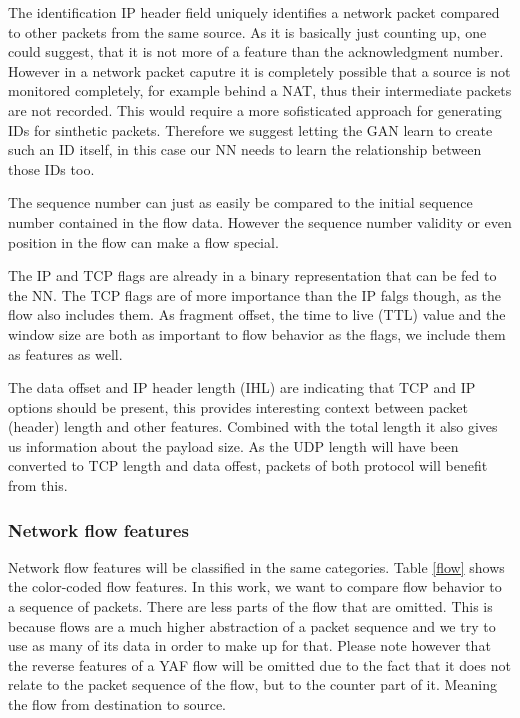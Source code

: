 \documentclass[
	ngerman,
	ruledheaders=section,%
	class=report,%
	thesis={type=bachelor},%
	accentcolor=9c,%
	custommargins=true,%
	marginpar=false,%
	parskip=half-,%
	fontsize=11pt,%
]{tudapub}
\begin{document}
The identification IP header field uniquely identifies a network packet compared to other packets from the same source.
As it is basically just counting up, one could suggest, that it is not more of a feature than the acknowledgment number.
However in a network packet caputre it is completely possible that a source is not monitored completely, for example behind a NAT,
thus their intermediate packets are not recorded.
This would require a more sofisticated approach for generating IDs for sinthetic packets.
Therefore we suggest letting the GAN learn to create such an ID itself, in this case our NN needs to learn the relationship between those IDs too.

The sequence number can just as easily be compared to the initial sequence number contained in the flow data.
However the sequence number validity or even position in the flow can make a flow special.

The IP and TCP flags are already in a binary representation that can be fed to the NN.
The TCP flags are of more importance than the IP falgs though, as the flow also includes them.
As fragment offset, the time to live (TTL) value and the window size are both as important to flow behavior as the flags, we include them as features as well.

The data offset and IP header length (IHL) are indicating that TCP and IP options should be present, this provides interesting context between packet (header) length and other features.
Combined with the total length it also gives us information about the payload size.
As the UDP length will have been converted to TCP length and data offest, packets of both protocol will benefit from this.


\subsubsection{Network flow features}
\label{sec:flowFeatures}

Network flow features will be classified in the same categories.
Table \ref{flow} shows the color-coded flow features.
In this work, we want to compare flow behavior to a sequence of packets.
There are less parts of the flow that are omitted.
This is because flows are a much higher abstraction of a packet sequence and we try to use as many of its data in order to make up for that.
Please note however that the reverse features of a YAF flow will be omitted due to the fact that it does not relate to the packet sequence of the flow, but to the counter part of it.
Meaning the flow from destination to source.
\end{document}
